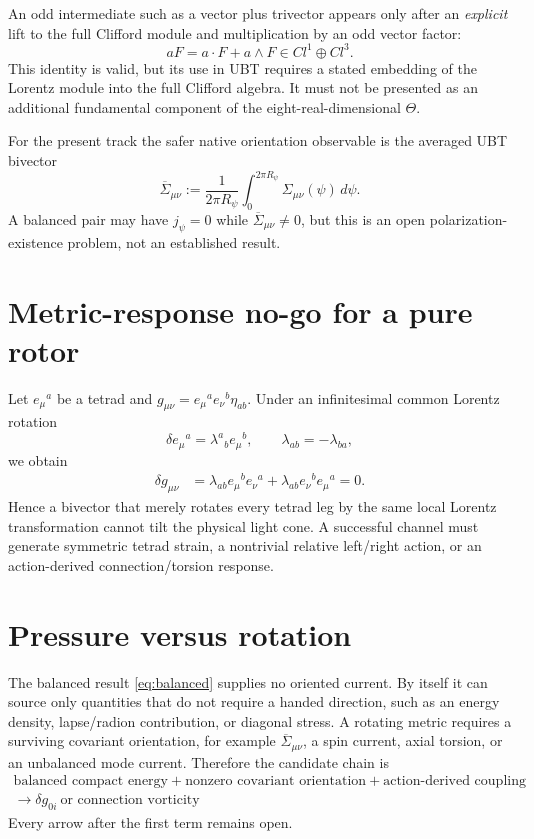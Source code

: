 \documentclass[11pt]{article}
\newcommand{\avg}[1]{\overline{#1}}
\begin{document}
An odd intermediate such as a vector plus trivector appears only after an
\emph{explicit} lift to the full Clifford module and multiplication by an odd
vector factor:
\begin{equation}
 aF=a\mathbin{\cdot}F+a\mathbin{\wedge}F
 \in Cl^1\oplus Cl^3.
\end{equation}
This identity is valid, but its use in UBT requires a stated embedding of the
Lorentz module into the full Clifford algebra.  It must not be presented as an
additional fundamental component of the eight-real-dimensional \(\Theta\).

For the present track the safer native orientation observable is the averaged
UBT bivector
\begin{equation}
 \avg{\Sigma}_{\mu\nu}
 :=\frac{1}{2\pi R_\psi}
 \int_0^{2\pi R_\psi}\Sigma_{\mu\nu}(\psi)\,d\psi.
 \label{eq:sigmabar}
\end{equation}
A balanced pair may have \(j_\psi=0\) while
\(\avg{\Sigma}_{\mu\nu}\neq0\), but this is an open polarization-existence
problem, not an established result.

\section{Metric-response no-go for a pure rotor}
Let \(e_\mu{}^a\) be a tetrad and
\(g_{\mu\nu}=e_\mu{}^ae_\nu{}^b\eta_{ab}\).  Under an infinitesimal common
Lorentz rotation
\begin{equation}
 \delta e_\mu{}^a=\lambda^a{}_b e_\mu{}^b,
 \qquad \lambda_{ab}=-\lambda_{ba},
\end{equation}
we obtain
\begin{align}
 \delta g_{\mu\nu}
 &=\lambda_{ab}e_\mu{}^be_\nu{}^a
   +\lambda_{ab}e_\nu{}^be_\mu{}^a=0.
 \label{eq:rotor-nogo}
\end{align}
Hence a bivector that merely rotates every tetrad leg by the same local
Lorentz transformation cannot tilt the physical light cone.  A successful
channel must generate symmetric tetrad strain, a nontrivial relative
left/right action, or an action-derived connection/torsion response.

\section{Pressure versus rotation}
The balanced result \eqref{eq:balanced} supplies no oriented current.  By
itself it can source only quantities that do not require a handed direction,
such as an energy density, lapse/radion contribution, or diagonal stress.
A rotating metric requires a surviving covariant orientation, for example
\(\avg{\Sigma}_{\mu\nu}\), a spin current, axial torsion, or an unbalanced
mode current.  Therefore the candidate chain is
\begin{equation}
 \begin{gathered}
 \text{balanced compact energy}
 +\text{nonzero covariant orientation}
 +\text{action-derived coupling}\\
 \longrightarrow
 \delta g_{0i}\ \text{or connection vorticity}
 \end{gathered}
 \label{eq:chain}
\end{equation}
Every arrow after the first term remains open.
\end{document}
